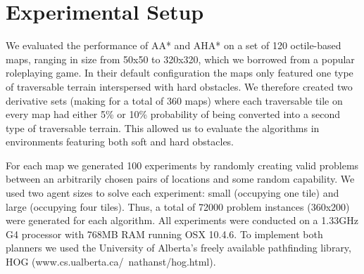 \section{Experimental Setup}
We evaluated the performance of AA* and AHA* on a set of 120 octile-based maps, ranging in size from 50x50 to 320x320, which we borrowed from a popular roleplaying game.
In their default configuration the maps only featured one type of traversable terrain interspersed with hard obstacles. 
We therefore created two derivative sets (making for a total of 360 maps) where each traversable tile on every map had either 5\% or 10\% probability of being converted into a second type of traversable terrain. 
This allowed us to evaluate the algorithms in environments featuring both soft and hard obstacles.
\par \indent
For each map we generated 100 experiments by randomly creating valid problems between an arbitrarily chosen pairs of locations and some random capability.
We used two agent sizes to solve each experiment: small (occupying one tile) and large (occupying four tiles). 
Thus, a total of 72000 problem instances (360x200) were generated for each algorithm. 
All experiments were conducted on a 1.33GHz G4 processor with 768MB RAM running OSX 10.4.6.
To implement both planners we used the University of Alberta's freely available pathfinding library, HOG (www.cs.ualberta.ca/~nathanst/hog.html). 
